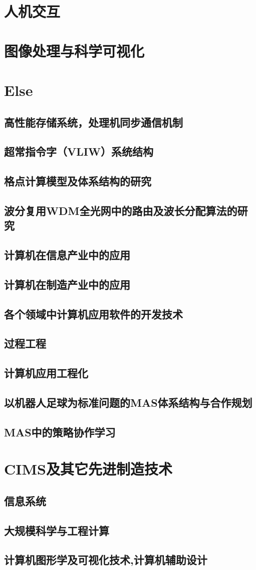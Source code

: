 \documentclass[UTF8]{../computerUniverse}
\begin{document}
\chapter{人机交互}
\chapter{图像处理与科学可视化}



\chapter{Else}
\section{高性能存储系统，处理机同步通信机制}
\section{超常指令字（VLIW）系统结构}
\section{格点计算模型及体系结构的研究}
\section{波分复用WDM全光网中的路由及波长分配算法的研究}
\section{计算机在信息产业中的应用}
\section{计算机在制造产业中的应用}
\section{各个领域中计算机应用软件的开发技术}
\section{过程工程}
\section{计算机应用工程化}
\section{以机器人足球为标准问题的MAS体系结构与合作规划}
\section{MAS中的策略协作学习}
\chapter{CIMS及其它先进制造技术}
\section{信息系统}
\section{大规模科学与工程计算}
\section{计算机图形学及可视化技术,计算机辅助设计}
\end{document}
